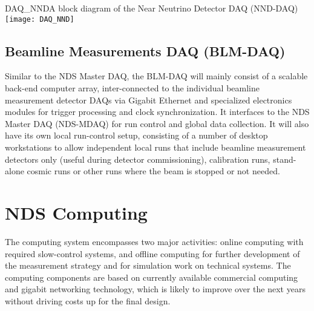 \begin{cdrfigure}{DAQ_NND}{A block diagram of the Near Neutrino Detector DAQ (NND-DAQ)}
\texttt{[image: DAQ\_NND]}
\end{cdrfigure}


\subsection{Beamline Measurements DAQ (BLM-DAQ)}

Similar to the NDS Master DAQ, the BLM-DAQ will mainly consist of a scalable back-end 
computer array, inter-connected to the individual beamline measurement detector DAQs via 
Gigabit Ethernet and specialized electronics modules for trigger processing and clock 
synchronization. 
It interfaces to the NDS Master DAQ (NDS-MDAQ) for run control and global 
data collection. It will also have its own local run-control setup, consisting of a number 
of desktop workstations to allow independent local runs that include beamline measurement 
detectors only (useful during detector commissioning), calibration runs, stand-alone cosmic 
runs or other runs where the beam is stopped or not needed.


\section{NDS Computing}
\label{sec:nd-gdaq-global-computing}

The computing system encompasses two major activities: online computing with required 
slow-control systems, and offline computing for further development of the measurement 
strategy and for simulation work on technical systems. The computing components are based 
on currently available commercial computing and gigabit networking technology, which is 
likely to improve over the next years without driving costs up for the final design.  

